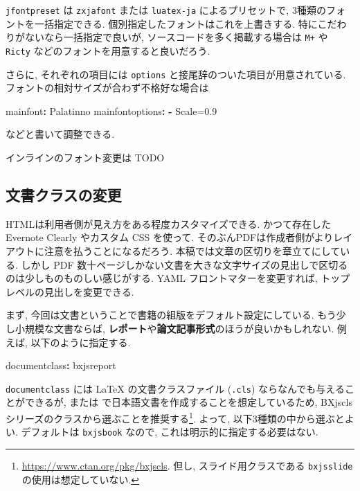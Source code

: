 \documentclass[
  nomag]{bxjsbook}
\newenvironment{Shaded}{\begin{snugshade}}{\end{snugshade}}
\newcommand{\AttributeTok}[1]{\textcolor[rgb]{0.77,0.63,0.00}{#1}}
\newcommand{\FunctionTok}[1]{\textcolor[rgb]{0.00,0.00,0.00}{#1}}
\newcommand{\KeywordTok}[1]{\textcolor[rgb]{0.13,0.29,0.53}{\textbf{#1}}}
\theoremstyle{definition}
\theoremstyle{definition}
\theoremstyle{definition}
\theoremstyle{remark}
\begin{document}
\texttt{jfontpreset} は \texttt{zxjafont} または \texttt{luatex-ja}
によるプリセットで, 3種類のフォントを一括指定できる.
個別指定したフォントはこれを上書きする.
特にこだわりがないなら一括指定で良いが, ソースコードを多く掲載する場合は
\texttt{M+} や \texttt{Ricty} などのフォントを用意すると良いだろう.

さらに, それぞれの項目には \texttt{options}
と接尾辞のついた項目が用意されている.
フォントの相対サイズが合わず不格好な場合は

\begin{Shaded}
\begin{Highlighting}[]
\FunctionTok{mainfont}\KeywordTok{:}\AttributeTok{ Palatinno}
\FunctionTok{mainfontoptions}\KeywordTok{:}
\AttributeTok{  }\KeywordTok{{-}}\AttributeTok{ Scale=0.9}
\end{Highlighting}
\end{Shaded}

などと書いて調整できる.

インラインのフォント変更は TODO

\hypertarget{ux6587ux66f8ux30afux30e9ux30b9ux306eux5909ux66f4}{%
\subsection{文書クラスの変更}\label{ux6587ux66f8ux30afux30e9ux30b9ux306eux5909ux66f4}}

HTMLは利用者側が見え方をある程度カスタマイズできる. かつて存在した
Evernote Clearly やカスタム CSS を使って.
そのぶんPDFは作成者側がよりレイアウトに注意を払うことになるだろう.
本稿では文章の区切りを章立てにしている. しかし PDF
数十ページしかない文書を大きな文字サイズの見出しで区切るのは少しものものしい感じがする.
YAML フロントマターを変更すれば, トップレベルの見出しを変更できる.

まず, 今回は文書ということで書籍の組版をデフォルト設定にしている.
もう少し小規模な文書ならば,
\textbf{レポート}や\textbf{論文記事形式}のほうが良いかもしれない.
例えば, 以下のように指定する.

\begin{Shaded}
\begin{Highlighting}[]
\FunctionTok{documentclass}\KeywordTok{:}\AttributeTok{ bxjsreport}
\end{Highlighting}
\end{Shaded}

\texttt{documentclass} には LaTeX の文書クラスファイル (\texttt{.cls})
ならなんでも与えることができるが, \XeLaTeX または
\LuaLaTeX で日本語文書を作成することを想定しているため, BXjscls
シリーズのクラスから選ぶことを推奨する\footnote{\url{https://www.ctan.org/pkg/bxjscls}.
  但し, スライド用クラスである \texttt{bxjsslide}
  の使用は想定していない.}. よって, 以下3種類の中から選ぶとよい.
デフォルトは \texttt{bxjsbook} なので, これは明示的に指定する必要はない.
\end{document}
